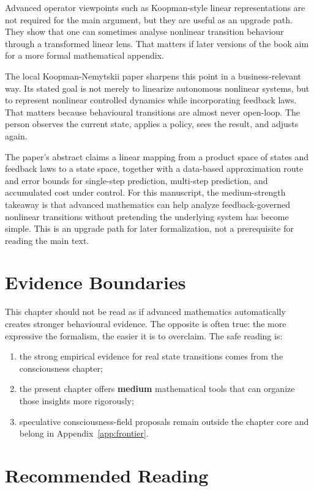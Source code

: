 Advanced operator viewpoints such as Koopman-style linear representations are
not required for the main argument, but they are useful as an upgrade path.
They show that one can sometimes analyse nonlinear transition behaviour through
a transformed linear lens. That matters if later versions of the book aim for a
more formal mathematical appendix.

The local Koopman-Nemytskii paper sharpens this point in a business-relevant
way. Its stated goal is not merely to linearize autonomous nonlinear systems,
but to represent nonlinear controlled dynamics while incorporating feedback
laws. That matters because behavioural transitions are almost never open-loop.
The person observes the current state, applies a policy, sees the result, and
adjusts again.

The paper's abstract claims a linear mapping from a product space of states and
feedback laws to a state space, together with a data-based approximation route
and error bounds for single-step prediction, multi-step prediction, and
accumulated cost under control. For this manuscript, the medium-strength
takeaway is that advanced mathematics can help analyze feedback-governed
nonlinear transitions without pretending the underlying system has become
simple. This is an upgrade path for later formalization, not a prerequisite for
reading the main text.

\section{Evidence Boundaries}

This chapter should not be read as if advanced mathematics automatically
creates stronger behavioural evidence. The opposite is often true: the more
expressive the formalism, the easier it is to overclaim. The safe reading is:
\begin{enumerate}[nosep]
  \item the strong empirical evidence for real state transitions comes from the
        consciousness chapter;
  \item the present chapter offers \textbf{medium} mathematical tools that can
        organize those insights more rigorously;
  \item speculative consciousness-field proposals remain outside the chapter
        core and belong in Appendix~\ref{app:frontier}.
\end{enumerate}

\section{Recommended Reading}


